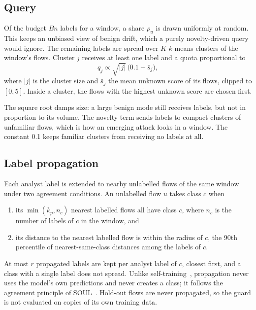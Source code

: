 \subsection{Query}
\label{sec:query}
Of the budget $Bn$ labels for a window, a share $\rho_u$ is drawn uniformly at random. This keeps an unbiased
view of benign drift, which a purely novelty-driven query would ignore. The remaining labels are spread over $K$
$k$-means clusters of the window's flows. Cluster $j$ receives at least one label and a quota proportional to
\begin{equation}
q_j \propto \sqrt{|j|}\,\bigl(0.1 + \bar{s}_j\bigr),
\end{equation}
where $|j|$ is the cluster size and $\bar{s}_j$ the mean unknown score of its flows, clipped to $[0,5]$. Inside a
cluster, the flows with the highest unknown score are chosen first.

The square root damps size: a large benign mode still receives labels, but not in proportion to its volume.
The novelty term sends labels to compact clusters of unfamiliar flows, which is how an emerging attack looks in a
window. The constant 0.1 keeps familiar clusters from receiving no labels at all.

\subsection{Label propagation}
\label{sec:prop}
Each analyst label is extended to nearby unlabelled flows of the same window under two agreement conditions. An
unlabelled flow $u$ takes class $c$ when
\begin{enumerate}
  \item its $\min(k_p, n_c)$ nearest labelled flows all have class $c$, where $n_c$ is the number of labels of
        $c$ in the window, and
  \item its distance to the nearest labelled flow is within the radius of $c$, the 90th percentile of
        nearest-same-class distances among the labels of $c$.
\end{enumerate}
At most $r$ propagated labels are kept per analyst label of $c$, closest first, and a class with a single label
does not spread. Unlike self-training~\cite{andresini2021insomnia,zhang2024aoc}, propagation never uses the model's
own predictions and never creates a class; it follows the agreement principle of SOUL~\cite{amalapuram2024soul}.
Hold-out flows are never propagated, so the guard is not evaluated on copies of its own training data.

